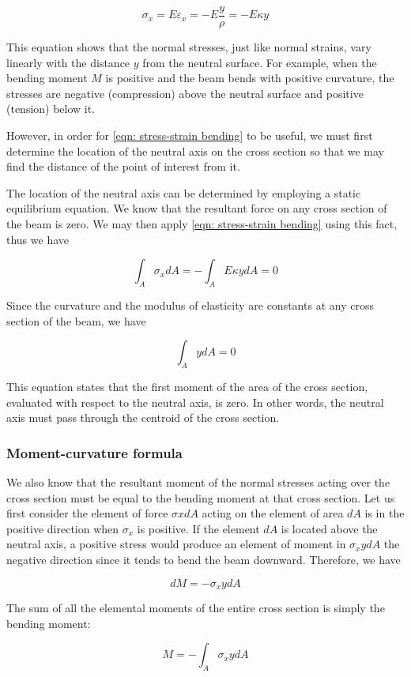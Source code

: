 \documentclass[a4paper,openany,nobib]{tufte-book}
\begin{document}
$$\sigma_x = E\varepsilon_x =  - E\frac{y}{\rho } =  - E\kappa y$$

This equation shows that the normal stresses, just like normal strains,
vary linearly with the distance \(y\) from the neutral surface. For
example, when the bending moment \(M\) is positive and the beam bends with
positive curvature, the stresses are negative (compression) above the
neutral surface and positive (tension) below it.

However, in order for \ref{eqn: stress-strain bending} to be
useful, we must first determine the location of the neutral axis on the
cross section so that we may find the distance of the point of interest
from it.

The location of the neutral axis can be determined by employing a static
equilibrium equation. We know that the resultant force on any cross
section of the beam is zero. We may then apply
\ref{eqn: stress-strain bending} using this
fact, thus we have

$$\int_A\sigma_x dA  =  - \int_A E\kappa ydA  = 0$$

Since the curvature and the modulus of elasticity are constants at any
cross section of the beam, we have

$$\int_A ydA = 0$$

This equation states that the first moment of the area of the cross
section, evaluated with respect to the neutral axis, is zero. In other
words, the neutral axis must pass through the centroid of the cross
section.

\subsubsection{Moment-curvature formula}
\label{moment-curvature-formula}
We also know that the resultant moment of the normal stresses acting
over the cross section must be equal to the bending moment at that cross
section. Let us first consider the element of force \(\sigma xdA\) acting
on the element of area \(dA\) is in the positive direction when \(\sigma_x\)
is positive. If the element \(dA\) is located above the neutral axis, a
positive stress would produce an element of moment in \(\sigma_xydA\) the
negative direction since it tends to bend the beam downward. Therefore,
we have


$$dM =  - \sigma _xydA$$

The sum of all the elemental moments of the entire cross section is
simply the bending moment:

$$M =  - \int_A \sigma_xydA$$
\end{document}
